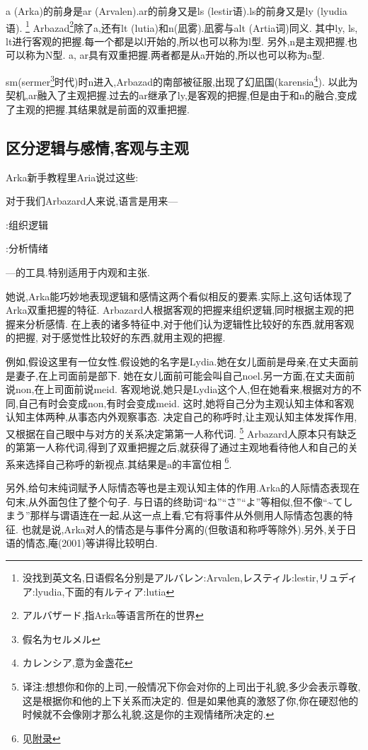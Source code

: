 a (Arka)的前身是ar (Arvalen).ar的前身又是ls (lestir语).ls的前身又是ly (lyudia语).
\footnote{没找到英文名,日语假名分别是アルバレン:Arvalen,レスティル:lestir,リュディア:lyudia,下面的有ルティア:lutia}
Arbazad\footnote{アルバザード,指Arka等语言所在的世界}除了a,还有lt (lutia)和n(凪雾).凪雾与alt (Artia词)同义.
其中ly, ls, lt进行客观的把握.每一个都是以l开始的,所以也可以称为l型.
另外,n是主观把握.也可以称为N型.
a, ar具有双重把握.两者都是从a开始的,所以也可以称为a型.

sm(sermer\footnote{假名为セルメル}时代)时n进入,Arbazad的南部被征服,出现了幻凪国(karensia\footnote{カレンシア,意为金盏花}).
以此为契机,ar融入了主观把握.过去的ar继承了ly,是客观的把握,但是由于和n的融合,变成了主观的把握.其结果就是前面的双重把握.

\subsection{区分逻辑与感情,客观与主观}

Arka新手教程里Aria说过这些:

{\kaishu 对于我们Arbazard人来说,语言是用来---

:组织逻辑

:分析情绪

---的工具.特别适用于内观和主张.}

她说,Arka能巧妙地表现逻辑和感情这两个看似相反的要素.实际上,这句话体现了Arka双重把握的特征.
Arbazard人根据客观的把握来组织逻辑,同时根据主观的把握来分析感情.
在上表的诸多特征中,对于他们认为逻辑性比较好的东西,就用客观的把握,
对于感觉性比较好的东西,就用主观的把握.

例如,假设这里有一位女性.假设她的名字是Lydia.她在女儿面前是母亲,在丈夫面前是妻子,在上司面前是部下.
她在女儿面前可能会叫自己noel.另一方面,在丈夫面前说non,在上司面前说meid.
客观地说,她只是Lydia这个人,但在她看来,根据对方的不同,自己有时会变成non,有时会变成meid.
这时,她将自己分为主观认知主体和客观认知主体两种,从事态内外观察事态.
决定自己的称呼时,让主观认知主体发挥作用,又根据在自己眼中与对方的关系决定第第一人称代词.
\footnote{译注:想想你和你的上司,一般情况下你会对你的上司出于礼貌,多少会表示尊敬,这是根据你和他的上下关系而决定的.
但是如果他真的激怒了你,你在硬怼他的时候就不会像刚才那么礼貌,这是你的主观情绪所决定的.}
Arbazard人原本只有缺乏的第第一人称代词,得到了双重把握之后,就获得了通过主观地看待他人和自己的关系来选择自己称呼的新视点.其结果是a的丰富位相
\footnote{见\hyperlink{appendix-pronouns}{附录}}.

另外,给句末纯词赋予人际情态等也是主观认知主体的作用.Arka的人际情态表现在句末,从外面包住了整个句子.
与日语的终助词``ね''``さ''``よ''等相似,但不像``\~{}てしまう''那样与谓语连在一起,从这一点上看,它有将事件从外侧用人际情态包裹的特征.
也就是说,Arka对人的情态是与事件分离的(但敬语和称呼等除外).另外,关于日语的情态,庵(2001)等讲得比较明白.

